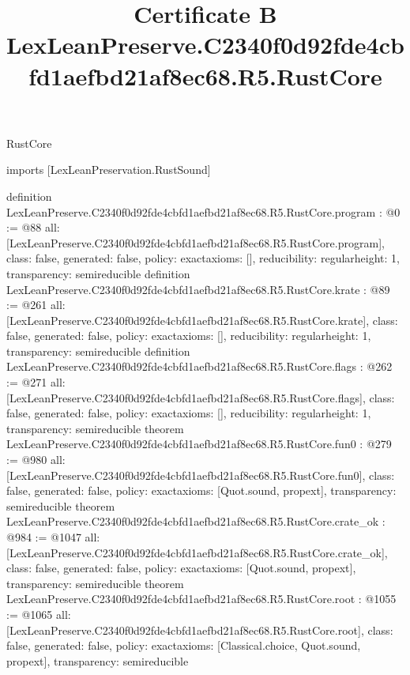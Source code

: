 \begin{lexlean}{RustCore}
\title{Certificate B LexLeanPreserve.C2340f0d92fde4cbfd1aefbd21af8ec68.R5.RustCore}
\begin{coremodule}
imports [LexLeanPreservation.RustSound]

definition LexLeanPreserve.C2340f0d92fde4cbfd1aefbd21af8ec68.R5.RustCore.program : @0 := @88 {
  all: [LexLeanPreserve.C2340f0d92fde4cbfd1aefbd21af8ec68.R5.RustCore.program],
  class: false,
  generated: false,
  policy: exact{axioms: []},
  reducibility: regular{height: 1},
  transparency: semireducible
}
definition LexLeanPreserve.C2340f0d92fde4cbfd1aefbd21af8ec68.R5.RustCore.krate : @89 := @261 {
  all: [LexLeanPreserve.C2340f0d92fde4cbfd1aefbd21af8ec68.R5.RustCore.krate],
  class: false,
  generated: false,
  policy: exact{axioms: []},
  reducibility: regular{height: 1},
  transparency: semireducible
}
definition LexLeanPreserve.C2340f0d92fde4cbfd1aefbd21af8ec68.R5.RustCore.flags : @262 := @271 {
  all: [LexLeanPreserve.C2340f0d92fde4cbfd1aefbd21af8ec68.R5.RustCore.flags],
  class: false,
  generated: false,
  policy: exact{axioms: []},
  reducibility: regular{height: 1},
  transparency: semireducible
}
theorem LexLeanPreserve.C2340f0d92fde4cbfd1aefbd21af8ec68.R5.RustCore.fun0 : @279 := @980 {
  all: [LexLeanPreserve.C2340f0d92fde4cbfd1aefbd21af8ec68.R5.RustCore.fun0],
  class: false,
  generated: false,
  policy: exact{axioms: [Quot.sound, propext]},
  transparency: semireducible
}
theorem LexLeanPreserve.C2340f0d92fde4cbfd1aefbd21af8ec68.R5.RustCore.crate_ok : @984 := @1047 {
  all: [LexLeanPreserve.C2340f0d92fde4cbfd1aefbd21af8ec68.R5.RustCore.crate_ok],
  class: false,
  generated: false,
  policy: exact{axioms: [Quot.sound, propext]},
  transparency: semireducible
}
theorem LexLeanPreserve.C2340f0d92fde4cbfd1aefbd21af8ec68.R5.RustCore.root : @1055 := @1065 {
  all: [LexLeanPreserve.C2340f0d92fde4cbfd1aefbd21af8ec68.R5.RustCore.root],
  class: false,
  generated: false,
  policy: exact{axioms: [Classical.choice, Quot.sound, propext]},
  transparency: semireducible
}


\end{coremodule}
\end{lexlean}
